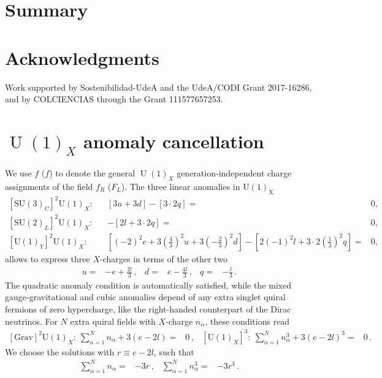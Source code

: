 \documentclass[12pt]{article}
\begin{document}
\section{Summary}

\section*{Acknowledgments}
Work supported by Sostenibilidad-UdeA and the UdeA/CODI Grant 2017-16286, and by COLCIENCIAS through the Grant 111577657253. 
\appendix
\section{$\operatorname{U}(1)_X$ anomaly cancellation }
We use $f$ ($f$) to denote the general $\operatorname{U}(1)_X$ generation-independent charge assignments of the field $f_R$ ($F_L$). The three linear anomalies in $\operatorname{U(1)_X}$~\cite{Campos:2017dgc}
\begin{align}
  \label{eq:anolin}
  \left[\mathrm{SU}(3)_{C}\right]^{2} \mathrm{U}(1)_{X} :& &
[3 u+3 d]-[3 \cdot 2 q]=&0, \nonumber\\
\left[\mathrm{SU}(2)_{L}\right]^{2} \mathrm{U}(1)_{X} :&&
-[2 l+3 \cdot 2 q]=&0, \nonumber\\
\left[\mathrm{U}(1)_{Y}\right]^{2} \mathrm{U}(1)_{X} :&&
{ \left[(-2)^{2} e+3\left(\tfrac{4}{3}\right)^{2} u+3\left(-\tfrac{2}{3}\right)^{2} d\right]-\left[2(-1)^{2} l+3 \cdot 2\left(\tfrac{1}{3}\right)^{2} q\right]}=&
 0,
  \end{align}
allows to express three $X$-charges in terms of the other two
\begin{align}
  u=&-e+\frac{2l}{3}\,,& d=& e-\frac{4l}{3}\,,& q=& -\frac{l}{3}\,.
\end{align}
The quadratic anomaly condition is automatically satisfied, while the mixed gauge-gravitational and cubic anomalies depend of any extra singlet quiral fermions of zero hypercharge, like the right-handed counterpart of the Dirac neutrinos. For $N$ extra quiral fields with $X$-charge $n_{\alpha}$, these conditions read
\begin{align}
  \left[\text{Grav}\right]^{2} \mathrm{U}(1)_{X}:\ \sum_{\alpha=1}^N n_{\alpha}+3 (e-2l)=&0\,, &  \left[\mathrm{U}(1)_{X}\right]^{3}:\ \sum_{\alpha=1}^N n_{\alpha}^3+3 (e-2l)^3=&0\,. &
\end{align}
We choose the solutions with $r\equiv e-2l$, such that
\begin{align}
  \label{eq:anolam}
  \sum_{\alpha=1}^{N} n_{\alpha}=&-3 r\,,   & \sum_{\alpha=1}^{N} n_{\alpha}^3=&-3 r^3\,.
\end{align}
\end{document}
